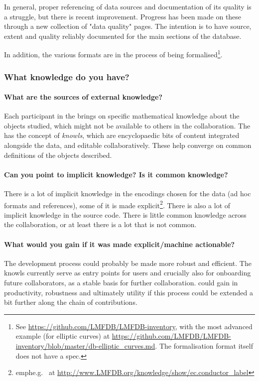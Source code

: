In general, proper referencing of data sources and documentation of its quality is a struggle, but there is recent improvement.
Progress has been made on these through a new collection of "data quality" pages. The intention is to have source, extent and quality reliably documented for the main sections of the database.

In addition, the various formats are in the process of being formalised\footnote{See \url{https://github.com/LMFDB/LMFDB-inventory}, with the most advanced example (for elliptic curves) at \url{https://github.com/LMFDB/LMFDB-inventory/blob/master/db-elliptic_curves.md}. The formalisation format itself does not have a spec.}.


\subsubsection{What knowledge do you have?}
\paragraph{What are the sources of external knowledge?}
Each participant in the \LMFDB brings on specific mathematical knowledge about the objects studied, which might not be available to others in the collaboration. The \LMFDB has the concept of \emph{knowls}, which are encyclopaedic bits of content integrated alongside the data, and editable collaboratively. These help converge on common definitions of the objects described.


\paragraph{Can you point to implicit knowledge? Is it common knowledge?}
There is a lot of implicit knowledge in the encodings chosen for the data (ad hoc formats and references), some of it is made explicit\footnote{emph{e.g.}~ at \url{http://www.LMFDB.org/knowledge/show/ec.conductor_label}}.
There is also a lot of implicit knowledge in the source code. There is little common knowledge across the collaboration, or at least there is a lot that is not common.

\paragraph{What would you gain if it was made explicit/machine actionable?}
The development process could probably be made more robust and efficient. The knowls currently serve as entry points for users and crucially also for onboarding future collaborators, as a stable basis for further collaboration. \LMFDB could gain in productivity, robustness and ultimately utility if this process could be extended a bit further along the chain of contributions.

